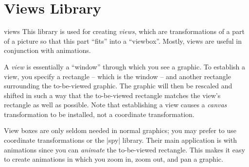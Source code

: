 %
%
%


\section{Views Library}
\label{section-library-views}

\begin{tikzlibrary}{views}
    This library is used for creating \emph{views}, which are transformations
    of a part of a picture so that this part ``fits'' into a ``viewbox''.
    Mostly, views are useful in conjunction with animations.
\end{tikzlibrary}

A \emph{view} is essentially a ``window'' through which you see a graphic. To
establish a view, you specify a rectangle -- which is the window -- and another
rectangle surrounding the to-be-viewed graphic. The graphic will then be
rescaled and shifted in such a way that the to-be-viewed rectangle matches the
view's rectangle as well as possible. Note that establishing a view causes a
\emph{canvas} transformation to be installed, not a coordinate transformation.

View boxes are only seldom needed in normal graphics; you may prefer to use
coordinate transformations or the |spy| library. Their main application is with
animations since you can \emph{animate} the to-be-viewed rectangle. This makes
it easy to create animations in which you zoom in, zoom out, and pan a graphic.

